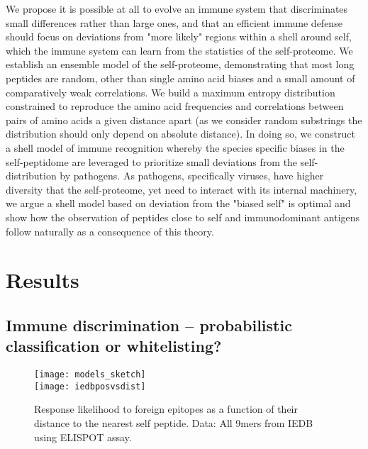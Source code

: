 \documentclass[superscriptaddress,twocolumn,pre]{revtex4}
\newcommand{\<}{\langle}
\renewcommand{\>}{\rangle}
\begin{document}
We propose it is possible at all to evolve an immune system that discriminates small differences rather than large ones, and that an efficient immune defense should focus on deviations from "more likely" regions within a shell around self, which the immune system can learn from the statistics of the self-proteome. We establish an ensemble model of the self-proteome, demonstrating that most long peptides are random, other than single amino acid biases and a small amount of comparatively weak correlations. We build a maximum entropy distribution constrained to reproduce the amino acid frequencies and correlations between pairs of amino acids a given distance apart (as we consider random substrings the distribution should only depend on absolute distance).  In doing so, we construct a shell model of immune recognition whereby the species specific biases in the self-peptidome are leveraged to prioritize small deviations from the self-distribution by pathogens. As pathogens, specifically viruses, have higher diversity that the self-proteome, yet need to interact with its internal machinery, we argue a shell model based on deviation from the "biased self" is optimal and show how the observation of peptides close to self and immunodominant antigens follow naturally as a consequence of this theory. 

\section{Results}

\subsection{Immune discrimination -- probabilistic classification or whitelisting?}  %


 \begin{figure}
     \texttt{[image: models\_sketch]}\\
     \texttt{[image: iedbposvsdist]}
     \caption{Response likelihood to foreign epitopes as a function of their distance to the nearest self peptide. Data: All 9mers from IEDB using ELISPOT assay.
     \label{figiedbposvsdist}
     }
 \end{figure}
\end{document}
